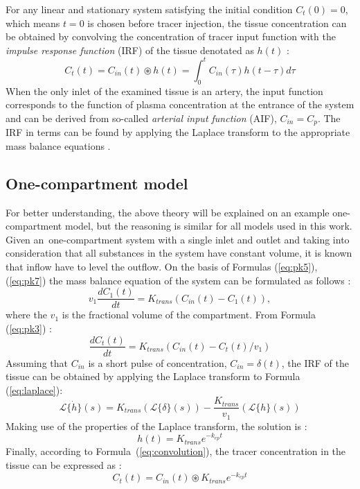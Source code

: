 For any linear and stationary system satisfying the 
initial condition $C_t(0) = 0$, which means $t = 0$ is chosen before tracer injection,
the tissue concentration can be obtained by convolving the concentration of tracer input function with the \textit{impulse response function} (IRF) of the tissue denotated as $h(t)$ \cite{sourbron2011scope}: 
\begin{equation}
	\label{eq:convolution}
	C_{t}(t) = C_{in}(t)\circledast h(t) = \int_{0}^{t}C_{in}(\tau)h(t-\tau)d\tau 
\end{equation}
When the only inlet of the examined tissue is an artery, the input function corresponds to the function of plasma concentration at the entrance of the system and can be derived from so-called \textit{arterial input function} (AIF), $C_{in} = C_{p}$. The IRF in terms can be found by applying the Laplace transform to the appropriate mass balance equations \cite{thesis}.
\newpage

\subsection{One-compartment model}
For better understanding, the above theory will be explained on an example one-compartment model, but the reasoning is similar for all models used in this work. Given an~one-compartment system with a single inlet and outlet and taking into consideration that all substances in the system have constant volume, it is known that inflow have to level the outflow. On the basis of Formulas (\ref{eq:pk5}), (\ref{eq:pk7}) the mass balance equation of the system can be formulated as follows \cite{thesis}:
\begin{equation}
v_1\frac{dC_1(t)}{dt} = K_{trans}(C_{in}(t)-C_1(t)),
\end{equation}
where the $v_1$ is the fractional volume of the compartment. From Formula (\ref{eq:pk3}) \cite{thesis}:
\begin{equation}
\frac{dC_t(t)}{dt} = K_{trans}(C_{in}(t)-C_t(t)/v_1)
\label{eq:laplace}
\end{equation}
Assuming that $C_{in}$ is a short pulse of concentration, $C_{in}=\delta(t)$, the IRF of the tissue can be obtained by applying the Laplace transform to Formula (\ref{eq:laplace}): 
\begin{equation}
\mathcal{L}\{\dot{h}\}(s) = K_{trans}(\mathcal{L}\{\delta\}(s)) - \frac{K_{trans}}{v_1}(\mathcal{L}\{h\}(s))
\end{equation}
Making use of the properties of the Laplace transform, the solution is \cite{thesis}:
\begin{equation}
h(t) = K_{trans}e^{-k_{ep}t}
\end{equation}
Finally, according to Formula~(\ref{eq:convolution}), the tracer concentration in the tissue can be expressed as \cite{thesis}:
\begin{equation}
	C_{t}(t) = C_{in}(t)\circledast  K_{trans}e^{-k_{ep}t} 
\end{equation}


